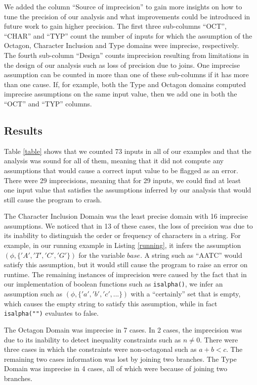 \documentclass[10pt]{report}
\begin{document}
We added the column ``Source of imprecision'' to gain more insights on how to tune the precision of our analysis and what improvements could be introduced in future work to gain higher precision. The first three sub-columns ``OCT'', ``CHAR'' and ``TYP'' count the number of inputs for which the assumption of the Octagon, Character Inclusion and Type domains were imprecise, respectively. The fourth sub-column ``Design'' counts imprecision resulting from limitations in the design of our analysis such as loss of precision due to joins. One imprecise assumption can be counted in more than one of these sub-columns if it has more than one cause. If, for example, both the Type and Octagon domains computed imprecise assumptions on the same input value, then we add one in both the ``OCT'' and ``TYP'' columns.  

\subsection{Results}
Table \ref{table} shows that we counted 73 inputs in all of our examples and that the analysis was sound for all of them, meaning that it did not compute any assumptions that would cause a correct input value to be flagged as an error. There were 29 imprecisions, meaning that for 29 inputs, we could find at least one input value that satisfies the assumptions inferred by our analysis that would still cause the program to crash. 

The Character Inclusion Domain was the least precise domain with 16 imprecise assumptions. We noticed that in 13 of these cases, the loss of precision was due to its inability to distinguish the order or frequency of characters  in a string. For example, in our running example in Listing \ref{running}, it infers the assumption $ (\phi, \lbrace 'A', 'T', 'C', 'G' \rbrace )$ for the variable $ base $. A string such as ``AATC'' would satisfy this assumption, but it would still cause the program to raise an error on runtime. The remaining instances of imprecision were caused by the fact that in our implementation of boolean functions such as \verb|isalpha()|, we infer an assumption such as $ (\phi, \lbrace 'a', 'b', 'c', ...\rbrace ) $ with a ``certainly'' set that is empty, which causes the empty string to satisfy this assumption, while in fact \verb|isalpha("")| evaluates to false. 

The Octagon Domain was imprecise in 7 cases. In 2 cases, the imprecision was due to its inability to detect inequality constraints such as $ n \neq 0 $. There were three cases in which the constraints were non-octagonal such as $ a + b < c $. The remaining two cases information was lost by joining two branches. The Type Domain was imprecise in 4 cases, all of which were because of joining two branches. 
\end{document}
